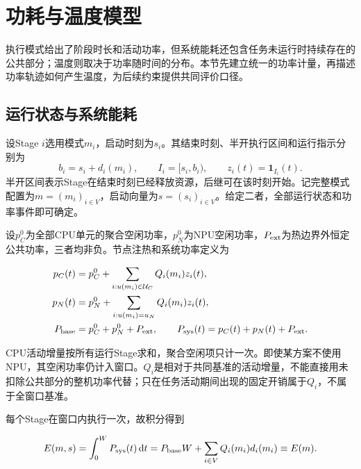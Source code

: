 \section{功耗与温度模型}

执行模式给出了阶段时长和活动功率，但系统能耗还包含任务未运行时持续存在的公共部分；温度则取决于功率随时间的分布。本节先建立统一的功率计量，再描述功率轨迹如何产生温度，为后续约束提供共同评价口径。

\subsection{运行状态与系统能耗}

设Stage \(i\)选用模式\(m_i\)，启动时刻为\(s_i\)。其结束时刻、半开执行区间和运行指示分别为
\begin{equation}
b_i=s_i+d_i(m_i),\qquad I_i=[s_i,b_i),\qquad z_i(t)=\mathbf1_{I_i}(t).
\label{eq:ch3-2}
\end{equation}
半开区间表示Stage在结束时刻已经释放资源，后继可在该时刻开始。记完整模式配置为\(m=(m_i)_{i\in V}\)，启动向量为\(s=(s_i)_{i\in V}\)。给定二者，全部运行状态和功率事件即可确定。



设\(p_C^0\)为全部CPU单元的聚合空闲功率，\(p_N^0\)为NPU空闲功率，\(P_{\rm ext}\)为热边界外恒定公共功率，三者均非负。节点注热和系统功率定义为

\begin{equation}
\begin{aligned}
p_C(t)&=p_C^0+\sum_{i:u(m_i)\in\mathcal U_C}Q_i(m_i)z_i(t),\\
p_N(t)&=p_N^0+\sum_{i:u(m_i)=u_N}Q_i(m_i)z_i(t),\\
P_{\rm base}&=p_C^0+p_N^0+P_{\rm ext},\qquad
P_{\rm sys}(t)=p_C(t)+p_N(t)+P_{\rm ext}.
\end{aligned}
\label{eq:ch3-9}
\end{equation}

CPU活动增量按所有运行Stage求和，聚合空闲项只计一次。即使某方案不使用NPU，其空闲功率仍计入窗口。\(Q_i\)是相对于共同基准的活动增量，不能直接用未扣除公共部分的整机功率代替；只在任务活动期间出现的固定开销属于\(Q_i\)，不属于全窗口基准。

每个Stage在窗口内执行一次，故积分得到

\begin{equation}
E(m,s)=\int_0^W P_{\rm sys}(t)\,\mathrm dt
=P_{\rm base}W+\sum_{i\in V}Q_i(m_i)d_i(m_i)
\equiv E(m).
\label{eq:ch3-10}
\end{equation}

